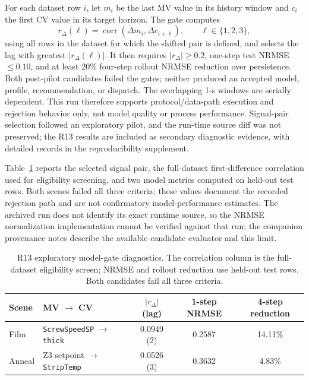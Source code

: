 For each dataset row $i$, let $m_i$ be the last MV value in its history window
and $c_i$ the first CV value in its target horizon. The gate computes
\begin{equation}
r_{\Delta}(\ell)=\operatorname{corr}(\Delta m_i,\Delta c_{i+\ell}),
\qquad \ell\in\{1,2,3\},
\label{eq:r13corr}
\end{equation}
using all rows in the dataset for which the shifted pair is defined, and
selects the lag with greatest $|r_{\Delta}(\ell)|$. It then requires
$|r_{\Delta}|\geq0.2$, one-step test NRMSE $\leq0.10$, and at least 20\%
four-step rollout NRMSE reduction over persistence. Both
post-pilot candidates failed the gates; neither produced an accepted model,
profile, recommendation, or dispatch. The overlapping 1-s windows are
serially dependent. This run therefore supports protocol/data-path execution
and rejection behavior only, not model quality or process performance.
Signal-pair selection followed an exploratory pilot, and the run-time source
diff was not preserved; the R13 results are included as secondary diagnostic
evidence, with detailed records in the reproducibility supplement.

Table~\ref{tab:r13gates} reports the selected signal pair, the full-dataset
first-difference correlation used for eligibility screening, and two model
metrics computed on held-out test rows. Both scenes failed all three criteria;
these values document the recorded rejection path and are not confirmatory
model-performance estimates. The archived run does not identify its exact
runtime source, so the NRMSE normalization implementation cannot be verified
against that run; the companion provenance notes describe the available
candidate evaluator and this limit.
\begin{table}[!t]
\centering
\caption{R13 exploratory model-gate diagnostics. The correlation column is
the full-dataset eligibility screen; NRMSE and rollout reduction use held-out
test rows. Both candidates fail all three criteria.}
\label{tab:r13gates}
\footnotesize
\setlength{\tabcolsep}{2.2pt}
\begin{tabularx}{\columnwidth}{@{}lXccc@{}}
\toprule
Scene & MV $\to$ CV & $|r_{\Delta}|$ (lag) & 1-step NRMSE & 4-step reduction \\
\midrule
Film & \shortstack[l]{\texttt{ScrewSpeedSP}\\$\to$ \texttt{thick}} & 0.0949 (2) & 0.2587 & 14.11\% \\
Anneal & \shortstack[l]{Z3 setpoint\\$\to$ \texttt{StripTemp}} & 0.0526 (3) & 0.3632 & 4.83\% \\
\bottomrule
\end{tabularx}
\end{table}

